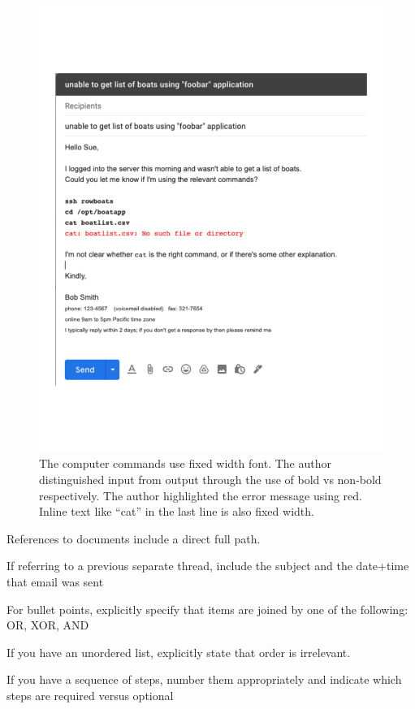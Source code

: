 \begin{figure}
\includegraphics[width=1\textwidth]{images/email_computer_font.pdf}
\caption{The computer commands use fixed width font. The author distinguished input from output through the use of bold vs non-bold respectively. The author highlighted the error message using red. Inline text like ``cat'' in the last line is also fixed width.}
\label{fig:email_computer_font}
\end{figure}

References to documents include a direct full path.

If referring to a previous separate thread, include the subject and the date+time that email was sent

For bullet points, explicitly specify that items are joined by one of the following: OR, XOR, AND

If you have an unordered list, explicitly state that order is irrelevant.

If you have a sequence of steps, number them appropriately and indicate which steps are required versus optional

